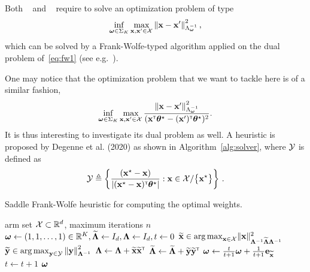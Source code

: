 Both \XYA~\citep{soare2014linear} and \RAGE~\citep{fiez2019transductive} require to solve an optimization problem of type
\begin{align}\label{eq:fw1}
    \inf_{{\boldsymbol \omega}\in\Sigma_K} \max_{{\bf x},{\bf x}'\in\mathcal{X}} \left\lVert{\bf x}-{\bf x}'\right\rVert^2_{\Lambda_{{\boldsymbol \omega}}^{-1}},
\end{align}
which can be solved by a Frank-Wolfe-typed algorithm applied on the dual problem of~\eqref{eq:fw1} (see e.g.~\citealt{ahipasaoglu2008fw}).

One may notice that the optimization problem that we want to tackle here is of a similar fashion,
\[
    \inf_{{\boldsymbol \omega}\in\Sigma_K} \max_{{\bf x},{\bf x}'\in\mathcal{X}} \frac{\left\lVert{\bf x} - {\bf x}'\right\rVert^2_{\Lambda_{{\boldsymbol \omega}}^{-1}}}{({\bf x}^\mathsf{\scriptscriptstyle T}{\boldsymbol \theta}^\star-({\bf x}')^\mathsf{\scriptscriptstyle T}{\boldsymbol \theta}^\star)^2}.
\]
It is thus interesting to investigate its dual problem as well. A heuristic is proposed by Degenne et al. (2020) as shown in Algorithm~\ref{alg:solver}, where $\mathcal{Y}$ is defined as \[
    \mathcal{Y} \triangleq \left\{ \frac{({\bf x}^\star- {\bf x})}{\left|({\bf x}^\star-{\bf x})^\mathsf{\scriptscriptstyle T}{\boldsymbol \theta}^\star\right|}: {\bf x}\in\mathcal{X}/\big\{{\bf x}^\star\big\}  \right\}\,.
\]

\begin{algorithm}[ht]
\centering
\caption{Saddle Frank-Wolfe heuristic for computing the optimal weights.}
\label{alg:solver}
\begin{algorithmic}[1]
    arm set $\mathcal{X}\subset\mathbb{R}^d$, maximum iterations $n$
    ${\boldsymbol \omega} \leftarrow{} (1, 1, \ldots, 1)\in\mathbb{R}^K, \mathbf{\widetilde{\Lambda}} \leftarrow{} I_d, \mathbf{\Lambda}\leftarrow{} I_d, t \leftarrow{} 0$
        \State $\mathbf{\widetilde{x}}\in\operatorname*{arg\,max}_{{\bf x}\in\mathcal{X}}  \lVert{\bf x}\rVert_{\mathbf{\Lambda}^{-1} \mathbf{\widetilde{\Lambda}} \mathbf{\Lambda}^{-1} }^2$
        \State $\mathbf{\widetilde{y}}\in\operatorname*{arg\,max}_{{\bf y}\in\mathcal{Y}}\left\lVert{\bf y}\right\rVert^2_{\mathbf{\Lambda}^{-1}}$
        \State $\mathbf{\Lambda}\leftarrow{} \mathbf{\Lambda}+ \mathbf{\widetilde{x}}\mathbf{\widetilde{x}}^\mathsf{\scriptscriptstyle T}$
		\State $\mathbf{\widetilde{\Lambda}} \leftarrow{} \mathbf{\widetilde{\Lambda}} + \mathbf{\widetilde{y}}\mathbf{\widetilde{y}}^\mathsf{\scriptscriptstyle T}$
        \State ${\boldsymbol \omega} \leftarrow{} \frac{t}{t+1}{\boldsymbol \omega} + \frac{1}{t+1}{\bf e}_{\mathbf{\widetilde{x}}}$
        \State $t \leftarrow{} t+1$
   \EndWhile
   \State \Return ${\boldsymbol \omega}$
\end{algorithmic}
\end{algorithm}